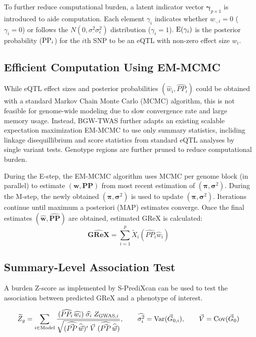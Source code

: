 \documentclass[11pt,hidelinks]{article}
\begin{document}
To further reduce computational burden, a latent indicator vector $\boldsymbol{\gamma}_{p\times 1}$ is introduced to aide computation. Each element $\gamma_i$ indicates whether $w_{\cdot,i}=0$ ($\gamma_i=0$) or follows the $N(0,\sigma_{\cdot}^2\sigma_{\epsilon}^2)$ distribution ($\gamma_i=1$). $\textnormal{E}(\gamma_i)$ is the posterior probability ($\textnormal{PP}_i$) for the $i$th SNP to be an eQTL with non-zero effect size $w_i$.

\subsection{Efficient Computation Using EM-MCMC}
While eQTL effect sizes and posterior probabilities $(\hat{w}_i, \widehat{PP}_i)$ could be obtained with a standard Markov Chain Monte Carlo (MCMC) algorithm, this is not feasible for genome-wide modeling due to slow convergence rate and large memory usage. Instead, BGW-TWAS further adapts an existing scalable expectation maximization EM-MCMC to use only summary statistics, incliding linkage disequillibrium and score statistics from standard eQTL analyses by single variant tests. Genotype regions are further pruned to reduce computational burden. 

During the E-step, the EM-MCMC algorithm uses MCMC per genome block (in parallel) to estimate $(\textbf{w},\textbf{PP})$ from most recent estimation of $(\boldsymbol{\pi},\boldsymbol{\sigma}^2)$. During the M-step, the newly obtained $(\boldsymbol{\pi},\boldsymbol{\sigma}^2)$ is used to update $(\boldsymbol{\pi},\boldsymbol{\sigma}^2)$. Iterations continue until maximum a posteriori (MAP) estimates converge. Once the final estimates $( \hat{\textbf{w}}, \widehat{\textbf{PP}} )$ are obtained, estimated GReX is calculated:
\[\widehat{\textbf{GReX}} = \sum_{i=1}^p \tilde{X}_i(\widehat{PP}_i\hat{w}_i) \]


\subsection{Summary-Level Association Test}
A burden Z-score as implemented by S-PrediXcan\cite{barbeiraExploringPhenotypicConsequences2018} can be used to test the association between predicted GReX and a phenotype of interest. 

\[{\widetilde{Z}_g} = \sum_{i \in \text{Model}} \frac{ (\widehat{PP_{i}}\,\widehat{w_{i}}) \; \widehat{\sigma_{i}}\; Z_{\textnormal{GWAS},i} }{ \sqrt{(\widehat{\vec{PP}}\,\widehat{\vec{w}})'\;\vec{V}\;(\widehat{\vec{PP}}\,\widehat{\vec{w}})} },\qquad\widehat{\sigma_{i}^{2}} = \text{Var}(\vec{G}_{0,i}),\qquad\vec{V} = \text{Cov}(\vec{G}_{0})\]
\end{document}
